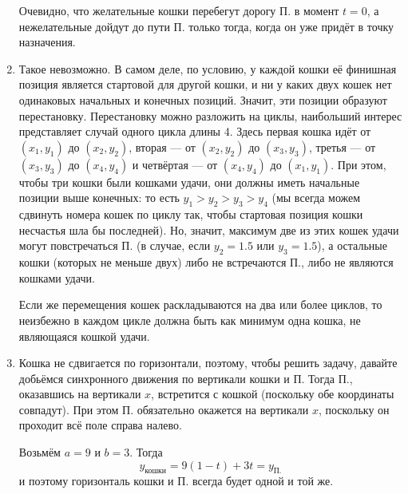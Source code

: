 \begin{enumerate}
Очевидно, что желательные кошки перебегут дорогу П. в момент $t=0$, а нежелательные дойдут до 
пути П. только тогда, когда он уже придёт в точку назначения.

\item Такое невозможно. В самом деле,
по условию, у каждой кошки её финишная позиция является стартовой для другой кошки, и
ни у каких двух кошек нет одинаковых начальных и конечных позиций.
Значит, эти позиции образуют перестановку. Перестановку можно разложить на циклы,
наибольший интерес представляет случай одного цикла длины 4. Здесь 
первая кошка идёт от $(x_1,y_1)$ до $(x_2,y_2)$, 
вторая --- от $(x_2,y_2)$ до $(x_3,y_3)$, третья --- от $(x_3,y_3)$ до $(x_4,y_4)$ и 
четвёртая --- от $(x_4,y_4)$ до $(x_1,y_1)$. 
При этом, чтобы три кошки были кошками удачи, 
они должны иметь начальные позиции выше конечных: то есть 
$y_1 > y_2 > y_3 > y_4$ (мы всегда можем сдвинуть номера кошек по циклу так, 
чтобы стартовая позиция кошки несчастья шла бы последней). Но, значит, максимум две из этих
кошек удачи могут повстречаться П. (в случае, если $y_2 = 1.5$ или $y_3 = 1.5$),
а остальные кошки (которых не меньше двух) либо не встречаются П., 
либо не являются кошками удачи.

Если же перемещения кошек раскладываются на два или более циклов, то неизбежно в 
каждом цикле должна быть как минимум одна кошка, не являющаяся кошкой удачи.

\item Кошка не сдвигается по горизонтали, поэтому, чтобы решить задачу, давайте добьёмся 
синхронного движения по вертикали кошки и П. Тогда П., 
оказавшись на вертикали $x$, встретится с кошкой (поскольку обе 
координаты совпадут). При этом П. обязательно окажется на вертикали $x$, поскольку
он проходит всё поле справа налево.

Возьмём $a=9$ и $b=3$. Тогда $$y_{\textit{кошки}} = 9(1-t) + 3t = y_{\textit{П.}}$$
и поэтому горизонталь кошки и П. всегда будет одной и той же.

\begin{center}\end{center}


\end{enumerate}
